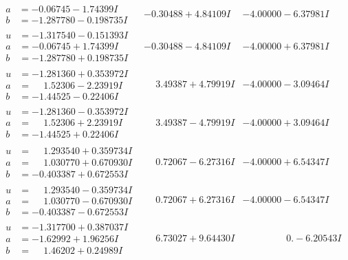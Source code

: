 \documentclass[1p]{elsarticle_modified}
\theoremstyle{definition}
\begin{document}
$$\begin{array}{c|c|c}
\begin{aligned}
a &= -0.06745 - 1.74399 I \\
b &= -1.287780 - 0.198735 I\end{aligned}
 & -0.30488 + 4.84109 I & -4.00000 - 6.37981 I \\ \hline\begin{aligned}
u &= -1.317540 - 0.151393 I \\
a &= -0.06745 + 1.74399 I \\
b &= -1.287780 + 0.198735 I\end{aligned}
 & -0.30488 - 4.84109 I & -4.00000 + 6.37981 I \\ \hline\begin{aligned}
u &= -1.281360 + 0.353972 I \\
a &= \phantom{-}1.52306 - 2.23919 I \\
b &= -1.44525 - 0.22406 I\end{aligned}
 & \phantom{-}3.49387 + 4.79919 I & -4.00000 - 3.09464 I \\ \hline\begin{aligned}
u &= -1.281360 - 0.353972 I \\
a &= \phantom{-}1.52306 + 2.23919 I \\
b &= -1.44525 + 0.22406 I\end{aligned}
 & \phantom{-}3.49387 - 4.79919 I & -4.00000 + 3.09464 I \\ \hline\begin{aligned}
u &= \phantom{-}1.293540 + 0.359734 I \\
a &= \phantom{-}1.030770 + 0.670930 I \\
b &= -0.403387 + 0.672553 I\end{aligned}
 & \phantom{-}0.72067 - 6.27316 I & -4.00000 + 6.54347 I \\ \hline\begin{aligned}
u &= \phantom{-}1.293540 - 0.359734 I \\
a &= \phantom{-}1.030770 - 0.670930 I \\
b &= -0.403387 - 0.672553 I\end{aligned}
 & \phantom{-}0.72067 + 6.27316 I & -4.00000 - 6.54347 I \\ \hline\begin{aligned}
u &= -1.317700 + 0.387037 I \\
a &= -1.62992 + 1.96256 I \\
b &= \phantom{-}1.46202 + 0.24989 I\end{aligned}
 & \phantom{-}6.73027 + 9.64430 I & \phantom{-0.000000 } 0. - 6.20543 I \\ \hline\begin{aligned}

\end{aligned}
\end{array}$$
\end{document}
